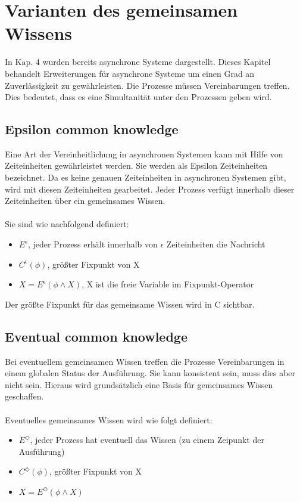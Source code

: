 \section{Varianten des gemeinsamen Wissens}
\label{GemeinsamesWissen}
In Kap. 4 wurden bereits asynchrone Systeme dargestellt. Dieses Kapitel behandelt Erweiterungen für asynchrone Systeme um einen Grad an Zuverlässigkeit zu gewährleisten. Die Prozesse müssen Vereinbarungen treffen. Dies bedeutet, dass es eine Simultanität unter den Prozessen geben wird. 
\subsection{Epsilon common knowledge}
\label{epsilon_comm_know}
Eine Art der Vereinheitlichung in asynchronen Systemen kann mit Hilfe von Zeiteinheiten gewährleistet werden. Sie werden als Epsilon Zeiteinheiten bezeichnet. Da es keine genauen Zeiteinheiten in asynchronen Systemen gibt, wird mit diesen Zeiteinheiten gearbeitet. Jeder Prozess verfügt innerhalb dieser Zeiteinheiten über ein gemeinsames Wissen.\\\\ Sie sind wie nachfolgend definiert:
\begin{itemize}
			\item $E^\epsilon$, jeder Prozess erhält innerhalb von $\epsilon$ Zeiteinheiten die Nachricht
			\item $C^\epsilon(\phi) $, größter Fixpunkt von X
			\item $X=E^\epsilon(\phi \wedge X) $, X ist die freie Variable im Fixpunkt-Operator 
		\end{itemize}
Der größte Fixpunkt für das gemeinsame Wissen wird in C sichtbar.
\subsection{Eventual common knowledge}
\label{eventual_comm_know}
Bei eventuellem gemeinsamen Wissen treffen die Prozesse Vereinbarungen in einem globalen Status der Ausführung. Sie kann konsistent sein, muss dies aber nicht sein. Hieraus wird grundsätzlich eine Basis für gemeinsames Wissen geschaffen. \\\\
Eventuelles gemeinsames Wissen wird wie folgt definiert:
\begin{itemize}
			\item $E^\Diamond$, jeder Prozess hat eventuell das Wissen (zu einem Zeipunkt der Ausführung)
			\item $C^\Diamond(\phi) $, größter Fixpunkt von X
			\item $X=E^\Diamond(\phi \wedge X) $

\end{itemize}

